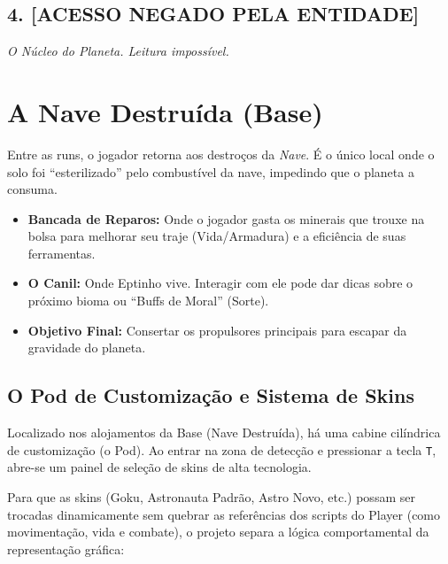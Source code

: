 \documentclass[a4paper,12pt]{report}
\begin{document}
\section{4. [ACESSO NEGADO PELA ENTIDADE]}
\textit{O Núcleo do Planeta. Leitura impossível.}

\chapter{A Nave Destruída (Base)}

Entre as runs, o jogador retorna aos destroços da \textit{Nave}. É o único local onde o solo foi ``esterilizado'' pelo combustível da nave, impedindo que o planeta a consuma.

\begin{itemize}
    \item \textbf{Bancada de Reparos:} Onde o jogador gasta os minerais que trouxe na bolsa para melhorar seu traje (Vida/Armadura) e a eficiência de suas ferramentas.
    \item \textbf{O Canil:} Onde Eptinho vive. Interagir com ele pode dar dicas sobre o próximo bioma ou ``Buffs de Moral'' (Sorte).
    \item \textbf{Objetivo Final:} Consertar os propulsores principais para escapar da gravidade do planeta.
\end{itemize}

\section{O Pod de Customização e Sistema de Skins}
Localizado nos alojamentos da Base (Nave Destruída), há uma cabine cilíndrica de customização (o Pod). Ao entrar na zona de detecção e pressionar a tecla \texttt{T}, abre-se um painel de seleção de skins de alta tecnologia.

Para que as skins (Goku, Astronauta Padrão, Astro Novo, etc.) possam ser trocadas dinamicamente sem quebrar as referências dos scripts do Player (como movimentação, vida e combate), o projeto separa a lógica comportamental da representação gráfica:
\end{document}
